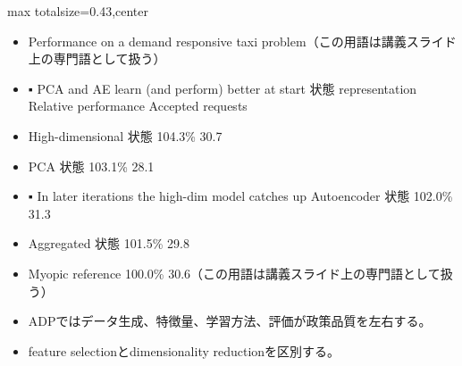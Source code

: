 \clearpage
{}
\begin{minipage}[t]{0.405\textwidth}
\begin{adjustbox}{max totalsize={\textwidth}{0.43\textheight},center}
\begin{minipage}{\textwidth}\scriptsize
{}\begin{itemize}
\item Performance on a demand responsive taxi problem（この用語は講義スライド上の専門語として扱う）
\item ▪ PCA and AE learn (and perform) better at start 状態 representation Relative performance Accepted requests
\item High-dimensional 状態 104.3\% 30.7
\item PCA 状態 103.1\% 28.1
\item ▪ In later iterations the high-dim model catches up Autoencoder 状態 102.0\% 31.3
\item Aggregated 状態 101.5\% 29.8
\item Myopic reference 100.0\% 30.6（この用語は講義スライド上の専門語として扱う）
\end{itemize}\begin{itemize}
\item ADPではデータ生成、特徴量、学習方法、評価が政策品質を左右する。
\item feature selectionとdimensionality reductionを区別する。
\end{itemize}
\end{minipage}
\end{adjustbox}
\end{minipage}\hfill
